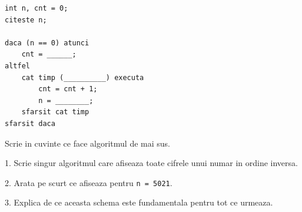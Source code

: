 \begin{solobox}
\begin{lstlisting}[style=codequest]
int n, cnt = 0;
citeste n;

daca (n == 0) atunci
    cnt = ______;
altfel
    cat timp (__________) executa
        cnt = cnt + 1;
        n = ________;
    sfarsit cat timp
sfarsit daca
\end{lstlisting}
\end{solobox}

\begin{solobox}
  Scrie in cuvinte ce face algoritmul de mai sus.
\end{solobox}

\newpage
{}

\begin{solobox}
  1. Scrie singur algoritmul care afiseaza toate cifrele unui numar in ordine inversa.

  2. Arata pe scurt ce afiseaza pentru \texttt{n = 5021}.

  3. Explica de ce aceasta schema este fundamentala pentru tot ce urmeaza.
\end{solobox}
